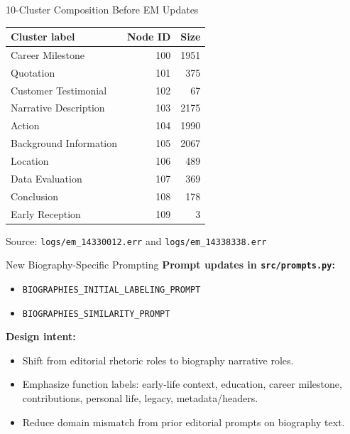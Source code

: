 \documentclass{beamer}
\begin{document}
\begin{frame}{10-Cluster Composition Before EM Updates}
\small
\begin{tabular}{lrr}
\toprule
Cluster label & Node ID & Size \\
\midrule
Career Milestone & 100 & 1951 \\
Quotation & 101 & 375 \\
Customer Testimonial & 102 & 67 \\
Narrative Description & 103 & 2175 \\
Action & 104 & 1990 \\
Background Information & 105 & 2067 \\
Location & 106 & 489 \\
Data Evaluation & 107 & 369 \\
Conclusion & 108 & 178 \\
Early Reception & 109 & 3 \\
\bottomrule
\end{tabular}

\vspace{0.4em}
\footnotesize Source: \texttt{logs/em\_14330012.err} and \texttt{logs/em\_14338338.err}
\end{frame}

\begin{frame}{New Biography-Specific Prompting}
\small
\textbf{Prompt updates in \texttt{src/prompts.py}:}
\begin{itemize}
  \item \texttt{BIOGRAPHIES\_INITIAL\_LABELING\_PROMPT}
  \item \texttt{BIOGRAPHIES\_SIMILARITY\_PROMPT}
\end{itemize}

\textbf{Design intent:}
\begin{itemize}
  \item Shift from editorial rhetoric roles to biography narrative roles.
  \item Emphasize function labels: early-life context, education, career milestone, contributions, personal life, legacy, metadata/headers.
  \item Reduce domain mismatch from prior editorial prompts on biography text.
\end{itemize}
\end{frame}
\end{document}
